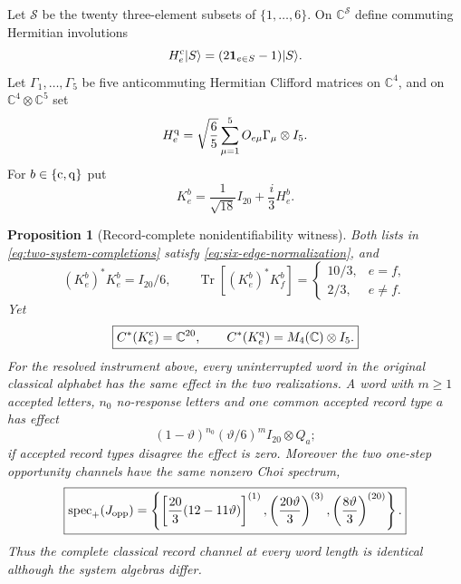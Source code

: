 \documentclass[11pt]{article}
\newtheorem{proposition}[theorem]{Proposition}
\theoremstyle{definition}
\theoremstyle{remark}
\newcommand{\C}{\mathbb C}
\newcommand{\Tr}{\operatorname{Tr}}
\newcommand{\spec}{\operatorname{spec}}
\begin{document}
Let $\mathscr S$ be the twenty three-element subsets of
$\{1,\ldots,6\}$.  On $\C^{\mathscr S}$ define commuting Hermitian
involutions
\[
 H_e^{\rm c}|S\rangle=(2\mathbf1_{e\in S}-1)|S\rangle.
\]
Let $\Gamma_1,\ldots,\Gamma_5$ be five anticommuting Hermitian Clifford
matrices on $\C^4$, and on $\C^4\otimes\C^5$ set
\[
 H_e^{\rm q}=\sqrt{\frac65}\sum_{\mu=1}^5O_{e\mu}\Gamma_\mu\otimes I_5.
\]
For $b\in\{{\rm c},{\rm q}\}$ put
\begin{equation}
 K_e^b=\frac1{\sqrt{18}}I_{20}+\frac{i}{3}H_e^b.
 \label{eq:two-system-completions}
\end{equation}

\begin{proposition}[Record-complete nonidentifiability witness]
\label{prop:record-witness}
Both lists in \eqref{eq:two-system-completions} satisfy
\eqref{eq:six-edge-normalization}, and
\begin{equation}
 (K_e^b)^*K_e^b=I_{20}/6,
 \qquad
 \Tr[(K_e^b)^*K_f^b]
 =\begin{cases}10/3,&e=f,\\2/3,&e\ne f.\end{cases}
 \label{eq:matching-record-data}
\end{equation}
Yet
\begin{equation}
 \boxed{
 C^*(K_e^{\rm c})=\C^{20},
 \qquad
 C^*(K_e^{\rm q})=M_4(\C)\otimes I_5.}
 \label{eq:inequivalent-system-algebras}
\end{equation}
For the resolved instrument above, every uninterrupted word in the original
classical alphabet has the same effect in the two realizations.  A word with
$m\ge1$ accepted letters, $n_0$ no-response letters and one common accepted
record type $a$ has effect
\begin{equation}
 (1-\vartheta)^{n_0}(\vartheta/6)^m I_{20}\otimes Q_a;
 \label{eq:record-word-effect}
\end{equation}
if accepted record types disagree the effect is zero.  Moreover the two one-step opportunity channels have the same nonzero Choi
spectrum,
\begin{equation}
 \boxed{
 \spec_+(J_{\rm opp})=
 \left\{
 \left[\frac{20}{3}(12-11\vartheta)\right]^{(1)},
 \left(\frac{20\vartheta}{3}\right)^{(3)},
 \left(\frac{8\vartheta}{3}\right)^{(20)}
 \right\}.}
 \label{eq:matching-Choi-spectrum}
\end{equation}
Thus the complete classical record channel at every word length is identical
although the system algebras differ.
\end{proposition}
\end{document}
